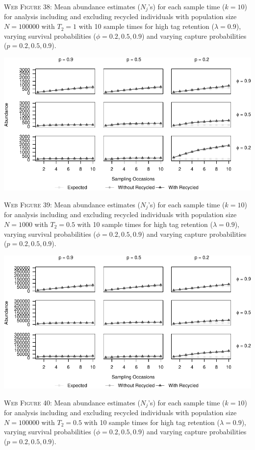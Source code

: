 \documentclass[]{article}
\begin{document}
\textsc{Web Figure 38:} Mean abundance estimates (\(N_j\)'s) for each
sample time (\(k=10\)) for analysis including and excluding recycled
individuals with population size \(N=100000\) with \(T_2=1\) with 10
sample times for high tag retention (\(\lambda=0.9\)), varying survival
probabilities (\(\phi=0.2,0.5,0.9\)) and varying capture probabilities
(\(p=0.2,0.5,0.9\)).

\newpage

\includegraphics{Appendix_BW_files/figure-latex/39_abundance_H_GJSTL4-1.pdf}

\textsc{Web Figure 39:} Mean abundance estimates (\(N_j\)'s) for each
sample time (\(k=10\)) for analysis including and excluding recycled
individuals with population size \(N=1000\) with \(T_2=0.5\) with 10
sample times for high tag retention (\(\lambda=0.9\)), varying survival
probabilities (\(\phi=0.2,0.5,0.9\)) and varying capture probabilities
(\(p=0.2,0.5,0.9\)).

\includegraphics{Appendix_BW_files/figure-latex/40_abundance_H_GJSTL3-1.pdf}

\textsc{Web Figure 40:} Mean abundance estimates (\(N_j\)'s) for each
sample time (\(k=10\)) for analysis including and excluding recycled
individuals with population size \(N=100000\) with \(T_2=0.5\) with 10
sample times for high tag retention (\(\lambda=0.9\)), varying survival
probabilities (\(\phi=0.2,0.5,0.9\)) and varying capture probabilities
(\(p=0.2,0.5,0.9\)).
\end{document}
